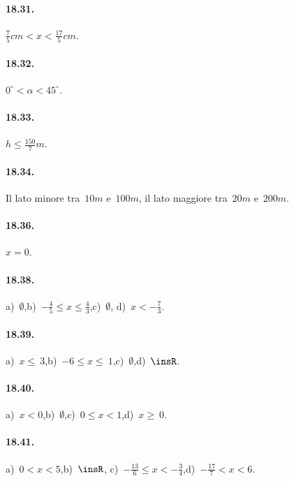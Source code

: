 \begin{multicols}{2}
\paragraph{18.31.} $\frac{7}{5}\unit{cm}<x<\frac{17}{5}\unit{cm}$.

\paragraph{18.32.} $0^{\circ}<\alpha<45^{\circ}$.

\paragraph{18.33.} $h\le \frac{150}{7}m$.
\end{multicols}

\paragraph{18.34.} Il lato minore tra~$10\unit{m}$ e~$100\unit{m}$, il lato maggiore tra~$20\unit{m}$ e~$200\unit{m}$.

\paragraph{18.36.} $x = 0$.

\paragraph{18.38.} a)~$\emptyset $,\quad b)~$-{\frac{4}{5}}\le x\le\frac{4}{3}$,\quad c)~$\emptyset $,\quad
d)~$x<-{\frac{7}{3}}$.

\paragraph{18.39.} a)~$x\le~3$,\quad b)~$-6\le x\le~1$,\quad c)~$\emptyset $,\quad d)~$\insR$.

\paragraph{18.40.} a)~$x<0$,\quad b)~$\emptyset $,\quad c)~$0\le x<1$,\quad d)~$x\ge~0$.

\paragraph{18.41.} a)~$0<x<5$,\quad b)~$\insR$,\quad
\quad c)~$-{\frac{13}{6}}\le x<-{\frac{3}{4}}$,\quad d)~$-{\frac{17}{7}}<x<6$.


